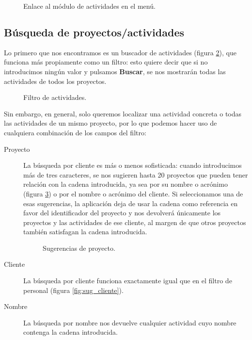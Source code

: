 \begin{figure}
\centering
{}
\caption{Enlace al módulo de actividades en el menú.}
\label{fig:inicio_act}
\end{figure}

\subsection{Búsqueda de proyectos/actividades}
\label{sec:manual_busqueda_actividades}

Lo primero que nos encontramos es un buscador de actividades (figura
\ref{fig:filtro_act}), que funciona más propiamente como un filtro: esto
quiere decir que si no introducimos ningún valor y pulsamos \textbf{Buscar}, se
nos mostrarán todas las actividades de todos los proyectos.

\begin{figure}
\centering
{}
\caption{Filtro de actividades.}
\label{fig:filtro_act}
\end{figure}

Sin embargo, en general, solo queremos localizar una actividad concreta o
todas las actividades de un mismo proyecto, por lo que podemos hacer uso de
cualquiera combinación de los campos del filtro:

\begin{description}
 \item[Proyecto] La búsqueda por cliente es más o menos sofisticada: cuando
introducimos más de tres caracteres, se nos sugieren hasta 20 proyectos que
pueden tener relación con la cadena introducida, ya sea por su nombre o
acrónimo (figura \ref{fig:sug_proyecto}) o por el nombre o acrónimo del cliente.
Si seleccionamos una de esas sugerencias, la aplicación deja de usar la cadena
como referencia en favor del identificador del proyecto y nos devolverá
únicamente los proyectos y las actividades de ese cliente, al margen de que
otros proyectos también satisfagan la cadena introducida.
  \begin{figure}
  \centering
  \caption{Sugerencias de proyecto.}
  \label{fig:sug_proyecto}
  \end{figure}
 \item[Cliente] La búsqueda por cliente funciona exactamente igual que en el
filtro de personal (figura \ref{fig:sug_cliente}).
 \item[Nombre] La búsqueda por nombre nos devuelve cualquier actividad cuyo
nombre contenga la cadena introducida.

\end{description}

